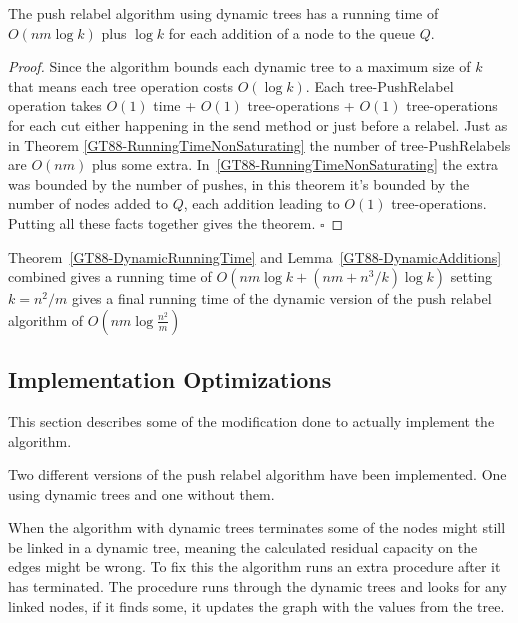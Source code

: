 \begin{theorem}\label{GT88-DynamicRunningTime}
The push relabel algorithm using dynamic trees has a running time of $O(nm\log{k})$ plus $\log{k}$ for each addition
of a node to the queue $Q$.
\end{theorem}
\begin{proof}
	Since the algorithm bounds each dynamic tree to a maximum size of $k$ that means each tree operation costs $O(\log{k})$.
	Each tree-PushRelabel operation takes $O(1)$ time + $O(1)$ tree-operations + $O(1)$ tree-operations for each cut either happening
	in the send method or just before a relabel. Just as in Theorem 
	\ref{GT88-RunningTimeNonSaturating} the number of tree-PushRelabels are $O(nm)$ plus some extra. In~\ref{GT88-RunningTimeNonSaturating}
	the extra was bounded by the number of pushes, in this theorem it's bounded by the number of nodes added to $Q$, each addition leading to
	$O(1)$ tree-operations. Putting all these facts together gives the theorem.
	$\square$
\end{proof}

Theorem~\ref{GT88-DynamicRunningTime} and Lemma~\ref{GT88-DynamicAdditions} combined gives a running time of
$O(nm\log{k} + (nm+n^3/k)\log{k})$ setting $k = n^2/m$ gives a final running time of the dynamic version 
of the push relabel algorithm of $O(nm\log{\frac{n^2}{m}})$
\subsection{Implementation Optimizations}\label{GT88-ImplementationModifications}
This section describes some of the modification done to actually implement the algorithm.

Two different versions of the push relabel algorithm have been implemented. One using dynamic trees
and one without them.

When the algorithm with dynamic trees terminates some of the nodes might still be linked in a dynamic tree, meaning the
calculated residual capacity on the edges might be wrong. To fix this the algorithm runs an extra procedure after it has terminated.
The procedure runs through the dynamic trees and looks for any linked nodes, if it finds some, it updates the graph with the values from the tree.
	